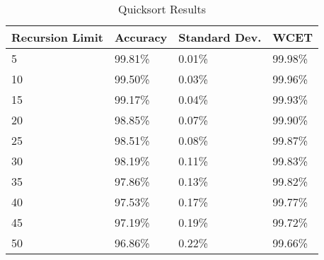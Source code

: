 \begin{table}[]
  \centering
  \caption{Quicksort Results}
  \label{quicksortT}
  \begin{tabular}{|l|l|l|l|}
    \hline
    \textbf{Recursion Limit} & \textbf{Accuracy}  & \textbf{Standard Dev.}  & \textbf{WCET}           \\ \hline
5 &  99.81\% &0.01\% &99.98\%   \\ \hline
10 &  99.50\% &0.03\% &99.96\%   \\ \hline
15 &  99.17\% &0.04\% &99.93\%   \\ \hline
20 &  98.85\% &0.07\% &99.90\%   \\ \hline
25 &  98.51\% &0.08\% &99.87\%   \\ \hline
30 &  98.19\% &0.11\% &99.83\%   \\ \hline
35 &  97.86\% &0.13\% &99.82\%   \\ \hline
40 &  97.53\% &0.17\% &99.77\%   \\ \hline
45 &  97.19\% &0.19\% &99.72\%   \\ \hline
50 &  96.86\% &0.22\% &99.66\%   \\ \hline
  \end{tabular}
\end{table}
